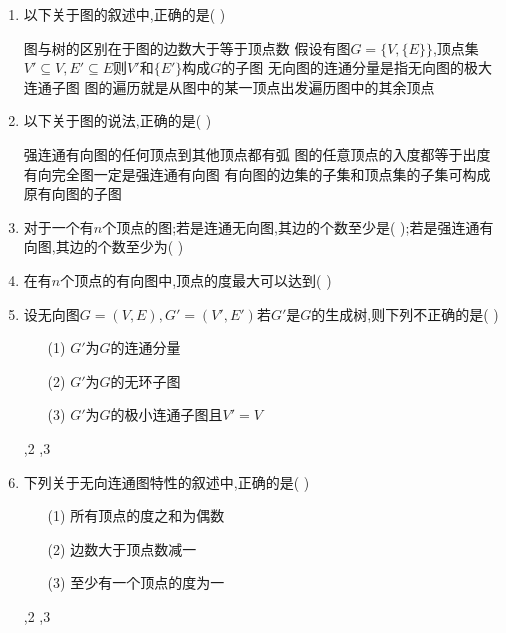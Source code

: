 \documentclass[12pt, a4paper, oneside, UTF8]{ctexbook}
\begin{document}
\begin{enumerate}
    \item 以下关于图的叙述中,正确的是(    ) 
    \begin{choices}[1]
        \task 图与树的区别在于图的边数大于等于顶点数 
        \task 假设有图$G=\{V,\{E\}\}$,顶点集$V'\subseteq V, E' \subseteq E$则$V'$和$\{E'\}$构成$G$的子图 
        \task 无向图的连通分量是指无向图的极大连通子图 
        \task 图的遍历就是从图中的某一顶点出发遍历图中的其余顶点 
    \end{choices}


    \item 以下关于图的说法,正确的是(   ) 
    \begin{choices}[1]
        \task 强连通有向图的任何顶点到其他顶点都有弧 
        \task 图的任意顶点的入度都等于出度 
        \task 有向完全图一定是强连通有向图 
        \task 有向图的边集的子集和顶点集的子集可构成原有向图的子图 
    \end{choices}


    \item 对于一个有$n$个顶点的图;若是连通无向图,其边的个数至少是(   );若是强连通有向图,其边的个数至少为(   ) 

    \item 在有$n$个顶点的有向图中,顶点的度最大可以达到(    ) 
    


    \item 设无向图$G=(V,E),G'=(V',E')$若$G'$是$G$的生成树,则下列不正确的是(   ) 
    \begin{enumerate}
        \item [(1)] $G'$为$G$的连通分量 
        \item [(2)] $G'$为$G$的无环子图
        \item [(3)] $G'$为$G$的极小连通子图且$V'=V$   
    \end{enumerate}
    \begin{choices}
        ,2  ,3 
    \end{choices}


    \item \bl 下列关于无向连通图特性的叙述中,正确的是(  ) 
    \begin{enumerate}
        \item [(1)] 所有顶点的度之和为偶数 
        \item [(2)] 边数大于顶点数减一 
        \item [(3)] 至少有一个顶点的度为一 
    \end{enumerate}
    \begin{choices}
          ,2 ,3 
    \end{choices}




\end{enumerate}
\end{document}
